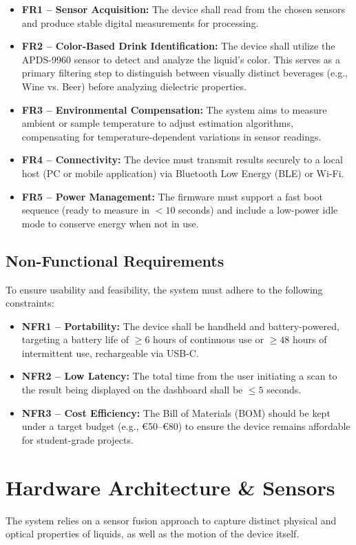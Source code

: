 \documentclass[12pt]{article}
\begin{document}
\begin{itemize}
    \item \textbf{FR1 -- Sensor Acquisition:} The device shall read from the chosen sensors and produce stable digital measurements for processing.
    \item \textbf{FR2 -- Color-Based Drink Identification:} The device shall utilize the APDS-9960 sensor to detect and analyze the liquid's color. This serves as a primary filtering step to distinguish between visually distinct beverages (e.g., Wine vs. Beer) before analyzing dielectric properties.
    \item \textbf{FR3 -- Environmental Compensation:} The system aims to measure ambient or sample temperature to adjust estimation algorithms, compensating for temperature-dependent variations in sensor readings.
    \item \textbf{FR4 -- Connectivity:} The device must transmit results securely to a local host (PC or mobile application) via Bluetooth Low Energy (BLE) or Wi-Fi.
    \item \textbf{FR5 -- Power Management:} The firmware must support a fast boot sequence (ready to measure in $<10$ seconds) and include a low-power idle mode to conserve energy when not in use.
\end{itemize}

\subsection{Non-Functional Requirements}
To ensure usability and feasibility, the system must adhere to the following constraints:

\begin{itemize}
    \item \textbf{NFR1 -- Portability:} The device shall be handheld and battery-powered, targeting a battery life of $\geq 6$ hours of continuous use or $\geq 48$ hours of intermittent use, rechargeable via USB-C.
    \item \textbf{NFR2 -- Low Latency:} The total time from the user initiating a scan to the result being displayed on the dashboard shall be $\leq 5$ seconds.
    \item \textbf{NFR3 -- Cost Efficiency:} The Bill of Materials (BOM) should be kept under a target budget (e.g., €50–€80) to ensure the device remains affordable for student-grade projects.
\end{itemize}


\section{Hardware Architecture \& Sensors}
The system relies on a sensor fusion approach to capture distinct physical and optical properties of liquids, as well as the motion of the device itself.
\end{document}

